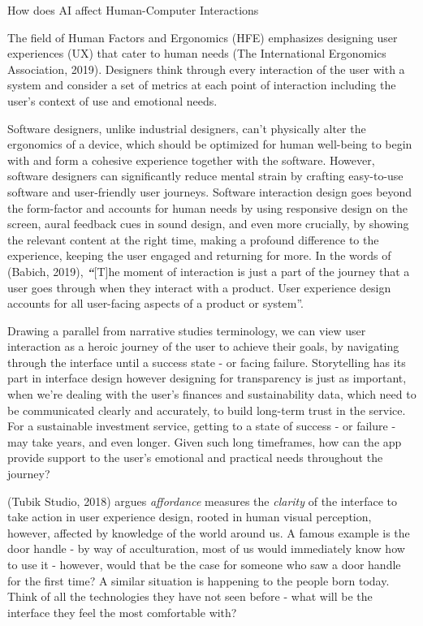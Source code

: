 \documentclass[
  letterpaper,
  DIV=11,
  numbers=noendperiod]{scrartcl}
\begin{document}
How does AI affect Human-Computer Interactions

The field of Human Factors and Ergonomics (HFE) emphasizes designing
user experiences (UX) that cater to human needs (The International
Ergonomics Association, 2019). Designers think through every interaction
of the user with a system and consider a set of metrics at each point of
interaction including the user's context of use and emotional needs.

Software designers, unlike industrial designers, can't physically alter
the ergonomics of a device, which should be optimized for human
well-being to begin with and form a cohesive experience together with
the software. However, software designers can significantly reduce
mental strain by crafting easy-to-use software and user-friendly user
journeys. Software interaction design goes beyond the form-factor and
accounts for human needs by using responsive design on the screen, aural
feedback cues in sound design, and even more crucially, by showing the
relevant content at the right time, making a profound difference to the
experience, keeping the user engaged and returning for more. In the
words of (Babich, 2019), \textbf{\emph{``}}{[}T{]}he moment of
interaction is just a part of the journey that a user goes through when
they interact with a product. User experience design accounts for all
user-facing aspects of a product or system''.

Drawing a parallel from narrative studies terminology, we can view user
interaction as a heroic journey of the user to achieve their goals, by
navigating through the interface until a success state - or facing
failure. Storytelling has its part in interface design however designing
for transparency is just as important, when we're dealing with the
user's finances and sustainability data, which need to be communicated
clearly and accurately, to build long-term trust in the service. For a
sustainable investment service, getting to a state of success - or
failure - may take years, and even longer. Given such long timeframes,
how can the app provide support to the user's emotional and practical
needs throughout the journey?

(Tubik Studio, 2018) argues \emph{affordance} measures the
\emph{clarity} of the interface to take action in user experience
design, rooted in human visual perception, however, affected by
knowledge of the world around us. A famous example is the door handle -
by way of acculturation, most of us would immediately know how to use it
- however, would that be the case for someone who saw a door handle for
the first time? A similar situation is happening to the people born
today. Think of all the technologies they have not seen before - what
will be the interface they feel the most comfortable with?
\end{document}
